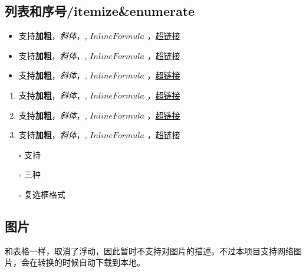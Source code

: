 \documentclass{article}
\begin{document}
\subsection{列表和序号/itemize\&enumerate}


\begin{itemize}
\item
支持\textbf{加粗}，\textit{斜体}，, $Inline Formula$ ，\href{http:///www.github.com}{超链接}
\item
支持\textbf{加粗}，\textit{斜体}，, $Inline Formula$ ，\href{http:///www.github.com}{超链接}
\item
支持\textbf{加粗}，\textit{斜体}，, $Inline Formula$ ，\href{http:///www.github.com}{超链接}
\end{itemize}



\begin{enumerate}
\item
支持\textbf{加粗}，\textit{斜体}，, $Inline Formula$ ，\href{http:///www.github.com}{超链接}
\item
支持\textbf{加粗}，\textit{斜体}，, $Inline Formula$ ，\href{http:///www.github.com}{超链接}
\item
支持\textbf{加粗}，\textit{斜体}，, $Inline Formula$ ，\href{http:///www.github.com}{超链接}
\end{enumerate}



\begin{itemize}
\item[\rlap{\raisebox{0.3ex}{\hspace{0.4ex}\tiny \ding{52}}}$\square$]
支持
\item[\rlap{\raisebox{0.3ex}{\hspace{0.4ex}\scriptsize \ding{56}}}$\square$]
三种
\item[$\square$]
复选框格式
\end{itemize}



\subsection{图片}


和表格一样，取消了浮动，因此暂时不支持对图片的描述。不过本项目支持网络图片，会在转换的时候自动下载到本地。
\end{document}
